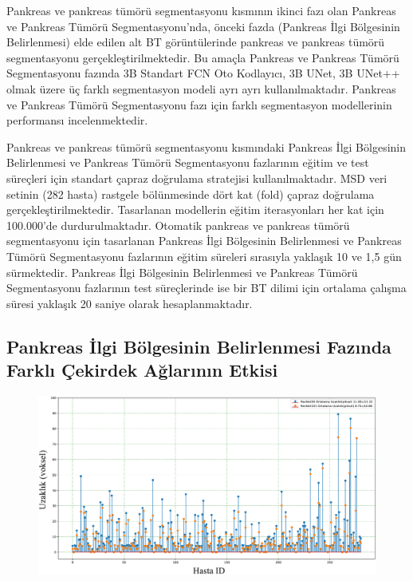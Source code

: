 Pankreas ve pankreas tümörü segmentasyonu kısmının ikinci fazı olan Pankreas ve Pankreas Tümörü Segmentasyonu’nda, önceki fazda (Pankreas İlgi Bölgesinin Belirlenmesi) elde edilen alt BT görüntülerinde pankreas ve pankreas tümörü segmentasyonu gerçekleştirilmektedir. Bu amaçla Pankreas ve Pankreas Tümörü Segmentasyonu fazında 3B Standart FCN Oto Kodlayıcı, 3B UNet, 3B UNet++ olmak üzere üç farklı segmentasyon modeli ayrı ayrı kullanılmaktadır. Pankreas ve Pankreas Tümörü Segmentasyonu fazı için farklı segmentasyon modellerinin performansı incelenmektedir.

Pankreas ve pankreas tümörü segmentasyonu kısmındaki Pankreas İlgi Bölgesinin Belirlenmesi ve Pankreas Tümörü Segmentasyonu fazlarının eğitim ve test süreçleri için standart çapraz doğrulama stratejisi kullanılmaktadır. MSD veri setinin (282 hasta) rastgele bölünmesinde dört kat (fold) çapraz doğrulama gerçekleştirilmektedir. Tasarlanan modellerin eğitim iterasyonları her kat için 100.000'de durdurulmaktadır. Otomatik pankreas ve pankreas tümörü segmentasyonu için tasarlanan Pankreas İlgi Bölgesinin Belirlenmesi ve Pankreas Tümörü Segmentasyonu fazlarının eğitim süreleri sırasıyla yaklaşık 10 ve 1,5 gün sürmektedir. Pankreas İlgi Bölgesinin Belirlenmesi ve Pankreas Tümörü Segmentasyonu fazlarının test süreçlerinde ise bir BT dilimi için ortalama çalışma süresi yaklaşık 20 saniye olarak hesaplanmaktadır.

\subsection{Pankreas İlgi Bölgesinin Belirlenmesi Fazında Farklı Çekirdek Ağlarının Etkisi}

\begin{figure}[h!]
	\begin{center}
		\vspace{0.4cm}
		{
			\vspace{0.4cm}
			\includegraphics[scale=0.38]{Bulgular-Irdeleme/Figures/center_distance.pdf}
		}
	\end{center}
\end{figure}

